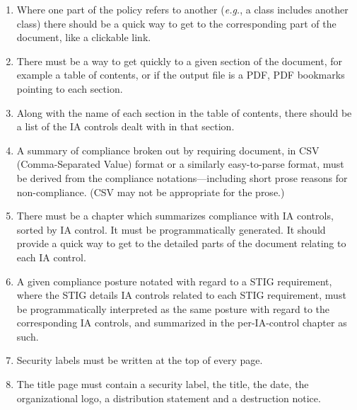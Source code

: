 \begin{enumerate}
\item Where one part of the policy refers to another (\emph{e.g.}, a class
includes another class) there should be a quick way to get to the
corresponding part of the document, like a clickable link.

\item There must be a way to get quickly to a given section of the
document, for example a table of contents, or if the output file is a PDF,
PDF bookmarks pointing to each section.

\item Along with the name of each section in the table of contents, there
should be a list of the IA controls dealt with in that section.

\item A summary of compliance broken out by requiring document, in CSV
(Comma-Separated Value) format or a similarly easy-to-parse format, must
be derived from the compliance notations---including short prose reasons
for non-compliance. (CSV may not be appropriate for the prose.)

\item There must be a chapter which summarizes compliance with IA
controls, sorted by IA control. It must be programmatically generated. It
should provide a quick way to get to the detailed parts of the document
relating to each IA control.

\item A given compliance posture notated with regard to a STIG
requirement, where the STIG details IA controls related to each STIG
requirement, must be programmatically interpreted as the same posture with
regard to the corresponding IA controls, and summarized in the
per-IA-control chapter as such.

\item Security labels must be written at the top of every page.

\item The title page must contain a security label, the title, the date,
the organizational logo, a distribution statement and a destruction
notice.

\end{enumerate}


